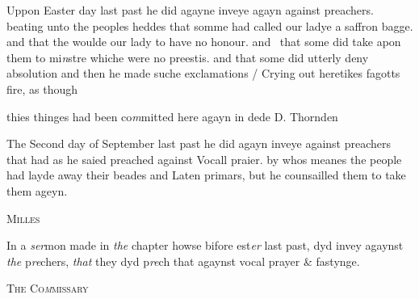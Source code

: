 \documentclass[12pt, a4paper]{book}
\begin{document}
		\ifthenelse{\isodd{\thepage}}
		{\reversemarginpar}
		{\normalmarginpar}
		 Uppon Easter day last past he did agayne inveye agayn against preachers.
 beating unto the peoples heddes that somme had called our ladye a
 saffron bagge. and that the woulde our lady to have no honour. and 
 that some did take apon them to mi\textit{n}stre whiche were no preestis.
 and that some did utterly deny absolution and then he made suche
 exclamations / Crying out heretikes fagotts fire, as though
               	
				\marginpar[\vspace{0.5cm}{\textcolor{Gray}{n}}]{}
			
		\ifthenelse{\isodd{\thepage}}
		{\reversemarginpar}
		{\normalmarginpar}
		 thies thinges had been co\textit{m}mitted here agayn in dede D. Thornden
 
				\marginpar[\vspace{0.5cm}{\textcolor{Gray}{sclaunderous}}]{}
			
		\ifthenelse{\isodd{\thepage}}
		{\reversemarginpar}
		{\normalmarginpar}
		 The Second day of September last past he did agayn inveye
 against preachers that had as he saied preached against Vocall
 praier. by whos meanes the people had layde away their beades
 and Laten primars, but he counsailled them to take them ageyn.

            
            
            	
				\begin{center} \begin{large} {\scshape Milles} \end{large} \end{center}
			

 
				\marginpar[\vspace{0.5cm}{\textcolor{Gray}{sclaunderous}}]{}
			
		\ifthenelse{\isodd{\thepage}}
		{\reversemarginpar}
		{\normalmarginpar}
		In a \textit{ser}mon made in \textit{the} chapter howse bifore est\textit{er} last past, dyd
 invey agaynst \textit{the} p\textit{re}chers, \textit{that} they dyd p\textit{re}ch that agaynst vocal prayer
 \& fastynge.
 

            
               
				\begin{center} \begin{large} {\scshape The Co\textit{m}missary} \end{large} \end{center}
			
\end{document}
